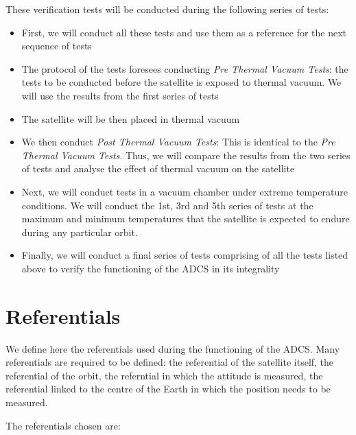 \documentclass[11pt,a4paper]{report}
\begin{document}
These verification tests will be conducted during the following series of tests: 

\begin{itemize}
\item
First, we will conduct all these tests and use them as a reference for the next sequence of tests 
\item 
The protocol of the tests foresees conducting \textit{Pre Thermal Vacuum Tests}: the tests to be conducted before the satellite is exposed to thermal vacuum. We will use the results from the first series of tests 
\item 
The satellite will be then placed in thermal vacuum 
\item 
We then conduct \textit{Post Thermal Vacuum Tests}: This is identical to the 
\textit{Pre Thermal Vacuum Tests}. Thus, we will compare the results from the two series of tests and analyse the effect of thermal vacuum on the satellite 
\item 
Next, we will conduct tests in a vacuum chamber under extreme temperature conditions. We will conduct the 1st, 3rd and 5th series of tests at the maximum and minimum temperatures that the satellite is expected to endure during any particular orbit. 
\item 
Finally, we will conduct a final series of tests comprising of all the tests listed above to verify the functioning of the ADCS in its integrality
\end{itemize}

\chapter{Referentials}\thispagestyle{fancy} 

We define here the referentials used during the functioning of the ADCS. Many referentials are required to be defined: the referential of the satellite itself, the referential of the orbit, the referntial in which the attitude is measured, the referential linked to the centre of the Earth in which the position needs to be measured. 

The referentials chosen are: 
\end{document}
